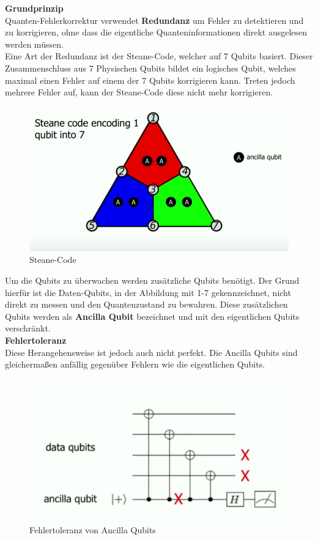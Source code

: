 \textbf{Grundprinzip}\\
Quanten-Fehlerkorrektur verwendet \textbf{Redundanz} um Fehler zu detektieren und zu korrigieren, ohne dass die eigentliche Quanteninformationen direkt ausgelesen werden müssen.\\

Eine Art der Redundanz ist der Steane-Code, welcher auf 7 Qubits basiert. Dieser Zusammenschluss aus 7 Physischen Qubits bildet ein logisches Qubit,
welches maximal einen Fehler auf einem der 7 Qubits korrigieren kann. Treten jedoch mehrere Fehler auf, kann der Steane-Code diese nicht mehr korrigieren.\\

\begin{figure}[H]
    \centering
    \includegraphics[width=0.75\linewidth]{img/Steane.png}
    \caption{Steane-Code}
    \label{fig:Steane}
\end{figure}

Um die Qubits zu überwachen werden zusätzliche Qubits benötigt. Der Grund hierfür ist die Daten-Qubits, in der Abbildung mit 1-7 gekennzeichnet, nicht direkt zu messen und den Quantenzustand zu bewahren.
Diese zusätzlichen Qubits werden als \textbf{Ancilla Qubit} bezeichnet und mit den eigentlichen Qubits verschränkt.\\

\textbf{Fehlertoleranz}\\
Diese Herangehensweise ist jedoch auch nicht perfekt. Die Ancilla Qubits sind gleichermaßen anfällig gegenüber Fehlern wie die eigentlichen Qubits.\\

\begin{figure}[H]
    \centering
    \includegraphics[width=0.75\linewidth]{img/Fehlertoleranz.png}
    \caption{Fehlertoleranz von Ancilla Qubits}
    \label{fig:Fehlertoleranz}
\end{figure}

